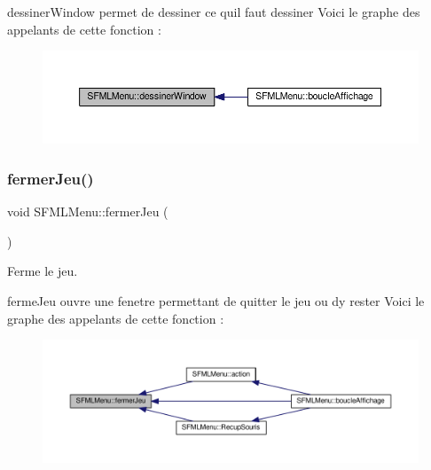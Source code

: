 dessiner\+Window permet de dessiner ce qu\textquotesingle{}il faut dessiner Voici le graphe des appelants de cette fonction \+:\nopagebreak
\begin{figure}[H]
\begin{center}
\leavevmode
\includegraphics[width=350pt]{class_s_f_m_l_menu_a5f87fa77e5029f1d2127e6796c6b6fd1_icgraph}
\end{center}
\end{figure}
\mbox{\label{class_s_f_m_l_menu_a1b9503962b7b6589b8a2dbd50f5a0d48}} 
\subsubsection{\texorpdfstring{fermer\+Jeu()}{fermerJeu()}}
{\footnotesize\ttfamily void S\+F\+M\+L\+Menu\+::fermer\+Jeu (\begin{DoxyParamCaption}{ }\end{DoxyParamCaption})\hspace{0.3cm}{\ttfamily [private]}}



Ferme le jeu. 

ferme\+Jeu ouvre une fenetre permettant de quitter le jeu ou d\textquotesingle{}y rester Voici le graphe des appelants de cette fonction \+:\nopagebreak
\begin{figure}[H]
\begin{center}
\leavevmode
\includegraphics[width=350pt]{class_s_f_m_l_menu_a1b9503962b7b6589b8a2dbd50f5a0d48_icgraph}
\end{center}
\end{figure}
\mbox{\label{class_s_f_m_l_menu_a563ba1ff94cc5a0a14345ef375f8549f}} 
